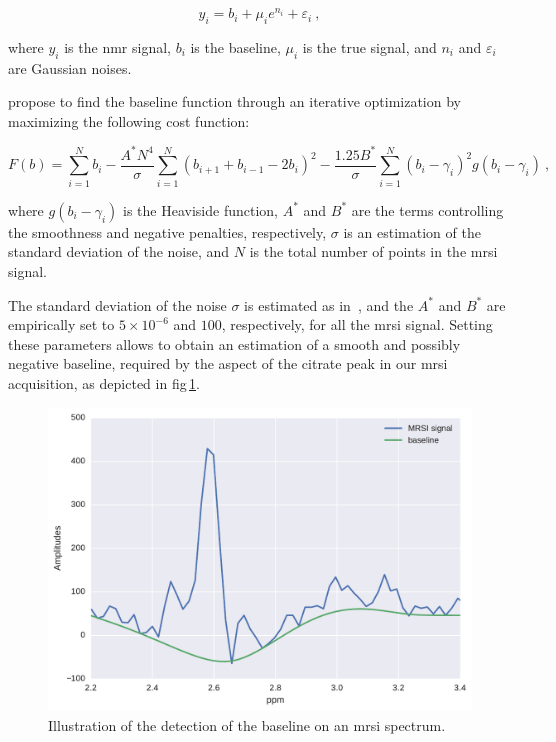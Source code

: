 \begin{equation}
  y_i = b_i + \mu_i e^{n_i} + \varepsilon_i \ ,
  \label{eq:methodBaselineDetectionModel}
\end{equation}

\noindent where $y_i$ is the \ac{nmr} signal, $b_i$ is the baseline, $\mu_i$ is the true signal, and $n_i$ and $\varepsilon_i$ are Gaussian noises.

\citeauthor{xi2008baseline} propose to find the baseline function through an iterative optimization by maximizing the following cost function:

\begin{equation}
  F(b) = \sum_{i = 1}^{N} b_i - \frac{A^{*} N^4}{\sigma} \sum_{i = 1}^{N} (b_{i+1} + b_{i-1} - 2 b_i)^2 - \frac{1.25 B^{*}}{\sigma} \sum_{i = 1}^{N} (b_i - \gamma_i)^2 g(b_i - \gamma_i) \ ,
  \label{eq:methodBaselineDetectionCostFunction}
\end{equation}

\noindent where $g(b_i - \gamma_i)$ is the Heaviside function, $A^*$ and $B^*$ are the terms controlling the smoothness and negative penalties, respectively, $\sigma$ is an estimation of the standard deviation of the noise, and $N$ is the total number of points in the \ac{mrsi} signal.

The standard deviation of the noise $\sigma$ is estimated as in~\cite{xi2008baseline}, and the $A^{*}$ and $B^{*}$ are empirically set to $5 \times 10^{-6}$ and $100$, respectively, for all the \ac{mrsi} signal.
Setting these parameters allows to obtain an estimation of a smooth and possibly negative baseline, required by the aspect of the citrate peak in our \ac{mrsi} acquisition, as depicted in \acs{fig}\,\ref{fig:baselinemrsi}.

\begin{figure}
  \centering
  \includegraphics[width=0.5\linewidth]{content/figures/baseline_mrsi.pdf}
  \caption{Illustration of the detection of the baseline on an \acs*{mrsi} spectrum.}
  \label{fig:baselinemrsi}
\end{figure}

